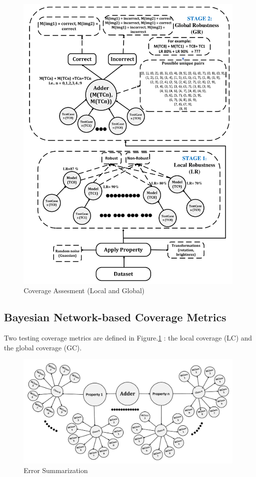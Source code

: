 \begin{figure}[h]
	\centering
	\includegraphics[width=1\textwidth]{figures/step4.pdf}
	\caption{Coverage Assesment (Local and Global)}
	\label{Coverage}
\end{figure}

\subsection{Bayesian Network-based Coverage Metrics}\hypertarget{Bayesian}{}
Two testing coverage metrics are defined in Figure.\ref{Coverage} : the local coverage (LC) and the global coverage (GC). 
\begin{figure}[h]
	\centering
	\includegraphics[width=1\textwidth]{figures/step5.pdf}
	\caption{Error Summarization}
	\label{Summarization}
\end{figure}

